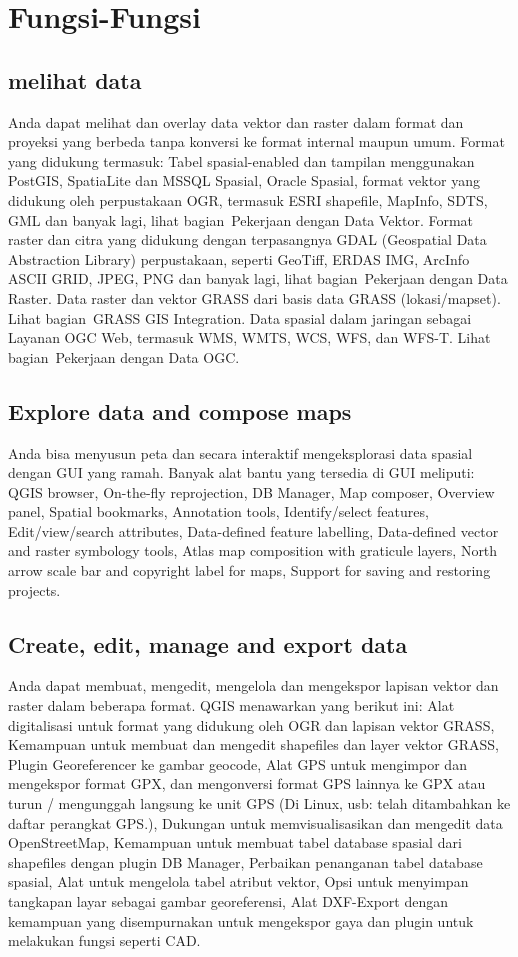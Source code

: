 \section{Fungsi-Fungsi}
	\subsection{melihat data}
	Anda dapat melihat dan overlay data vektor dan raster dalam format dan proyeksi yang berbeda tanpa konversi ke format internal maupun umum. Format yang didukung termasuk:
	Tabel spasial-enabled dan tampilan menggunakan PostGIS, SpatiaLite dan MSSQL Spasial, Oracle Spasial, format vektor yang didukung oleh perpustakaan OGR, termasuk ESRI shapefile, MapInfo, SDTS, GML dan banyak lagi, lihat bagian Pekerjaan dengan Data Vektor.
	Format raster dan citra yang didukung dengan terpasangnya GDAL (Geospatial Data Abstraction Library) perpustakaan, seperti GeoTiff, ERDAS IMG, ArcInfo ASCII GRID, JPEG, PNG dan banyak lagi, lihat bagian Pekerjaan dengan Data Raster.
	Data raster dan vektor GRASS dari basis data GRASS (lokasi/mapset). Lihat bagian GRASS GIS Integration.
	Data spasial dalam jaringan sebagai Layanan OGC Web, termasuk WMS, WMTS, WCS, WFS, dan WFS-T. Lihat bagian Pekerjaan dengan Data OGC.
	\subsection{Explore data and compose maps}
	Anda bisa menyusun peta dan secara interaktif mengeksplorasi data spasial dengan GUI yang ramah. Banyak alat bantu yang tersedia di GUI meliputi: QGIS browser, On-the-fly reprojection, DB Manager, Map composer, Overview panel, Spatial bookmarks, Annotation tools, Identify/select features, Edit/view/search attributes, Data-defined feature labelling, Data-defined vector and raster symbology tools, Atlas map composition with graticule layers, North arrow scale bar and copyright label for maps, Support for saving and restoring projects.
	\subsection{Create, edit, manage and export data}
	Anda dapat membuat, mengedit, mengelola dan mengekspor lapisan vektor dan raster dalam beberapa format. QGIS menawarkan yang berikut ini: Alat digitalisasi untuk format yang didukung oleh OGR dan lapisan vektor GRASS, Kemampuan untuk membuat dan mengedit shapefiles dan layer vektor GRASS, Plugin Georeferencer ke gambar geocode, Alat GPS untuk mengimpor dan mengekspor format GPX, dan mengonversi format GPS lainnya ke GPX atau turun / mengunggah langsung ke unit GPS (Di Linux, usb: telah ditambahkan ke daftar perangkat GPS.), Dukungan untuk memvisualisasikan dan mengedit data OpenStreetMap, Kemampuan untuk membuat tabel database spasial dari shapefiles dengan plugin DB Manager, Perbaikan penanganan tabel database spasial, Alat untuk mengelola tabel atribut vektor, Opsi untuk menyimpan tangkapan layar sebagai gambar georeferensi, Alat DXF-Export dengan kemampuan yang disempurnakan untuk mengekspor gaya dan plugin untuk melakukan fungsi seperti CAD.
